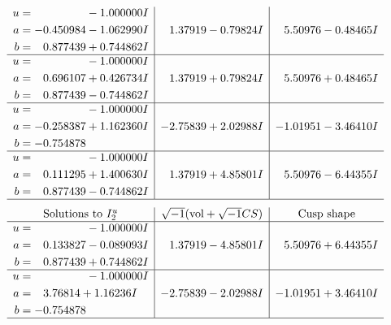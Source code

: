 \documentclass[1p]{elsarticle_modified}
\theoremstyle{definition}
\newcommand{\I}{\sqrt{-1}}
\begin{document}
$$\begin{array}{c|c|c}
\begin{aligned}
u &= \phantom{-0.000000 } -1.000000 I \\
a &= -0.450984 - 1.062990 I \\
b &= \phantom{-}0.877439 + 0.744862 I\end{aligned}
 & \phantom{-}1.37919 - 0.79824 I & \phantom{-}5.50976 - 0.48465 I \\ \hline\begin{aligned}
u &= \phantom{-0.000000 } -1.000000 I \\
a &= \phantom{-}0.696107 + 0.426734 I \\
b &= \phantom{-}0.877439 - 0.744862 I\end{aligned}
 & \phantom{-}1.37919 + 0.79824 I & \phantom{-}5.50976 + 0.48465 I \\ \hline\begin{aligned}
u &= \phantom{-0.000000 } -1.000000 I \\
a &= -0.258387 + 1.162360 I \\
b &= -0.754878\phantom{ +0.000000I}\end{aligned}
 & -2.75839 + 2.02988 I & -1.01951 - 3.46410 I \\ \hline\begin{aligned}
u &= \phantom{-0.000000 } -1.000000 I \\
a &= \phantom{-}0.111295 + 1.400630 I \\
b &= \phantom{-}0.877439 - 0.744862 I\end{aligned}
 & \phantom{-}1.37919 + 4.85801 I & \phantom{-}5.50976 - 6.44355 I\\
 \hline 
 \end{array}$$\newpage$$\begin{array}{c|c|c}  
\text{Solutions to }I^u_{2}& \I (\text{vol} + \sqrt{-1}CS) & \text{Cusp shape}\\
 \hline 
\begin{aligned}
u &= \phantom{-0.000000 } -1.000000 I \\
a &= \phantom{-}0.133827 - 0.089093 I \\
b &= \phantom{-}0.877439 + 0.744862 I\end{aligned}
 & \phantom{-}1.37919 - 4.85801 I & \phantom{-}5.50976 + 6.44355 I \\ \hline\begin{aligned}
u &= \phantom{-0.000000 } -1.000000 I \\
a &= \phantom{-}3.76814 + 1.16236 I \\
b &= -0.754878\phantom{ +0.000000I}\end{aligned}
 & -2.75839 - 2.02988 I & -1.01951 + 3.46410 I\\
 \hline 
 \end{array}$$\newpage\newpage\renewcommand{\arraystretch}{1}
\end{document}
